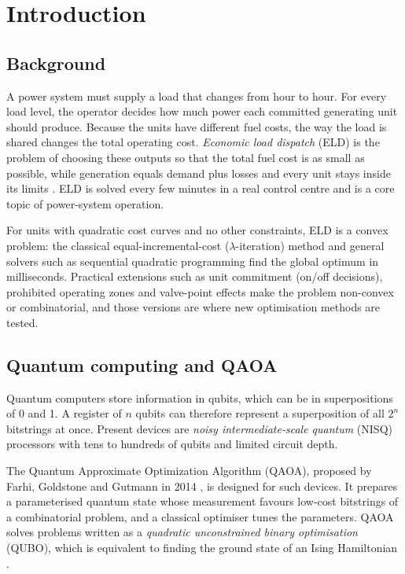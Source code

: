 \chapter{Introduction}

\section{Background}
A power system must supply a load that changes from hour to hour. For every load level, the operator decides how much power each committed generating unit should produce. Because the units have different fuel costs, the way the load is shared changes the total operating cost. \emph{Economic load dispatch} (ELD) is the problem of choosing these outputs so that the total fuel cost is as small as possible, while generation equals demand plus losses and every unit stays inside its limits \cite{wood2014}. ELD is solved every few minutes in a real control centre and is a core topic of power-system operation.

For units with quadratic cost curves and no other constraints, ELD is a convex problem: the classical equal-incremental-cost ($\lambda$-iteration) method and general solvers such as sequential quadratic programming find the global optimum in milliseconds. Practical extensions such as unit commitment (on/off decisions), prohibited operating zones and valve-point effects make the problem non-convex or combinatorial, and those versions are where new optimisation methods are tested.

\section{Quantum computing and QAOA}
Quantum computers store information in qubits, which can be in superpositions of 0 and 1. A register of $n$ qubits can therefore represent a superposition of all $2^n$ bitstrings at once. Present devices are \emph{noisy intermediate-scale quantum} (NISQ) processors with tens to hundreds of qubits and limited circuit depth.

The Quantum Approximate Optimization Algorithm (QAOA), proposed by Farhi, Goldstone and Gutmann in 2014 \cite{farhi2014}, is designed for such devices. It prepares a parameterised quantum state whose measurement favours low-cost bitstrings of a combinatorial problem, and a classical optimiser tunes the parameters. QAOA solves problems written as a \emph{quadratic unconstrained binary optimisation} (QUBO), which is equivalent to finding the ground state of an Ising Hamiltonian \cite{lucas2014}.

